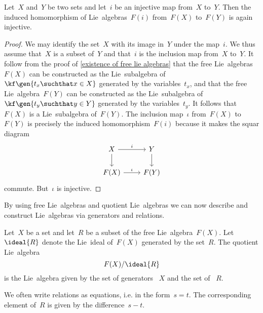 \begin{corollary}
	\label{subsets give free lie subalgebras}
	Let~$X$ and~$Y$ be two sets and let~$i$ be an injective map from~$X$ to~$Y$.
	Then the induced homomorphism of Lie~algebras~$F(i)$ from~$F(X)$ to~$F(Y)$ is again injective.
\end{corollary}


\begin{proof}
	We may identify the set~$X$ with its image in~$Y$ under the map~$i$.
	We thus assume that~$X$ is a subset of~$Y$ and that~$i$ is the inclusion map from~$X$ to~$Y$.
	It follow from the proof of \cref{existence of free lie algebras} that the free Lie~algebras~$F(X)$ can be constructed as the Lie~subalgebra of~$\kf\gen{ t_x \suchthat x \in X }$ generated by the variables~$t_x$, and that the free Lie~algebra~$F(Y)$ can be constructed as the Lie~subalgebra of~$\kf\gen{ t_y \suchthat y \in Y }$ generated by the variables~$t_y$.
	It follows that~$F(X)$ is a Lie~subalgebra of~$F(Y)$.
	The inclusion map~$\iota$ from~$F(X)$ to~$F(Y)$ is precisely the induced homomorphism~$F(i)$ because it makes the squar diagram
	\[
		\begin{tikzcd}
			X
			\arrow{r}[above]{i}
			\arrow{d}
			&
			Y
			\arrow{d}
			\\
			F(X)
			\arrow{r}[above]{\iota}
			&
			F(Y)
		\end{tikzcd}
	\]
	commute.
	But~$\iota$ is injective.
\end{proof}


\begin{fluff}
	By using free Lie~algebras and quotient Lie~algebras we can now describe and construct Lie~algebras via generators and relations.
\end{fluff}


\begin{definition}
	Let~$X$ be a set and let~$R$ be a subset of the free Lie~algebra~$F(X)$.
	Let~$\ideal{ R }$ denote the Lie~ideal of~$F(X)$ generated by the set~$R$.
	The quotient Lie~algebra
	\[
		F(X) / \ideal{ R }
	\]
	is the Lie~algebra given by the set of generators ~$X$ and the set of ~$R$.
\end{definition}


\begin{remark}
	We often write relations as equations, i.e. in the form~$s = t$.
	The corresponding element of~$R$ is given by the difference~$s - t$.
\end{remark}


